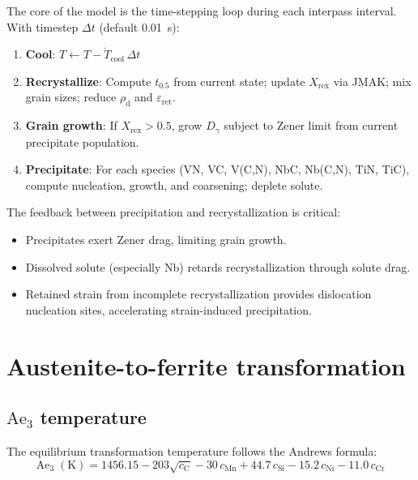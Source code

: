 \documentclass[11pt,a4paper]{article}
\newcommand{\DG}{\ensuremath{D_\gamma}}
\newcommand{\Xrex}{\ensuremath{X_\mathrm{rex}}}
\newcommand{\epsr}{\ensuremath{\varepsilon_\mathrm{ret}}}
\newcommand{\rhod}{\ensuremath{\rho_\mathrm{d}}}
\newcommand{\Ae}{\ensuremath{\mathrm{Ae}_3}}
\begin{document}
The core of the model is the time-stepping loop during each interpass interval.
With timestep $\Delta t$ (default \SI{0.01}{\second}):

\begin{enumerate}
  \item \textbf{Cool}: $T \leftarrow T - \dot{T}_\mathrm{cool}\,\Delta t$
  \item \textbf{Recrystallize}: Compute $t_{0.5}$ from current state; update
        \Xrex{} via JMAK; mix grain sizes; reduce \rhod{} and \epsr.
  \item \textbf{Grain growth}: If $\Xrex > 0.5$, grow \DG{} subject to Zener
        limit from current precipitate population.
  \item \textbf{Precipitate}: For each species (VN, VC, V(C,N), NbC, Nb(C,N),
        TiN, TiC), compute nucleation, growth, and coarsening; deplete solute.
\end{enumerate}

The feedback between precipitation and recrystallization is critical:
\begin{itemize}
  \item Precipitates exert Zener drag, limiting grain growth.
  \item Dissolved solute (especially Nb) retards recrystallization through
        solute drag.
  \item Retained strain from incomplete recrystallization provides dislocation
        nucleation sites, accelerating strain-induced precipitation.
\end{itemize}

\section{Austenite-to-ferrite transformation}
\label{sec:transform}

\subsection{\texorpdfstring{$\Ae$}{Ae3} temperature}

The equilibrium transformation temperature follows the Andrews formula:
\begin{equation}
  \Ae\;(\mathrm{K}) = 1456.15 - 203\sqrt{c_\mathrm{C}}
    - 30\,c_\mathrm{Mn} + 44.7\,c_\mathrm{Si}
    - 15.2\,c_\mathrm{Ni} - 11.0\,c_\mathrm{Cr}
  \label{eq:ae3}
\end{equation}
\end{document}
